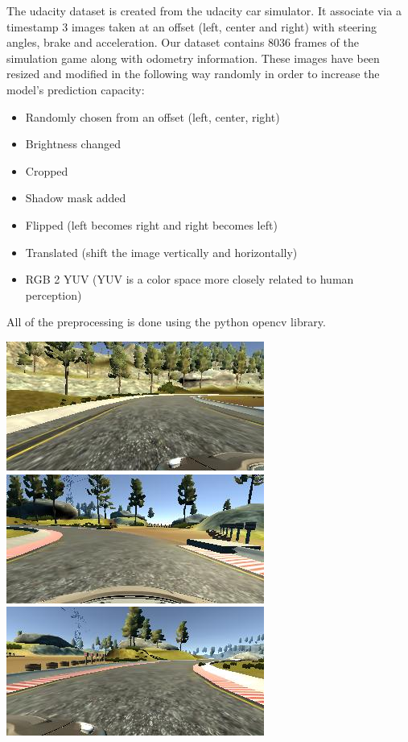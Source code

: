 \begin{multicols*}{2}
The udacity dataset is created from the udacity car simulator. It associate via a timestamp 3 images taken at an offset (left, center and right) with steering angles, brake and acceleration. Our dataset contains 8036 frames of the simulation game along with odometry information. These images have been resized and modified in the following way randomly in order to increase the model’s prediction capacity: 
\begin{itemize}	
	\item Randomly chosen from an offset (left, center, right)
	\item Brightness changed
	\item Cropped
	\item Shadow mask added
	\item Flipped (left becomes right and right becomes left)
	\item Translated (shift the image vertically and horizontally)
	\item RGB 2 YUV (YUV is a color space more closely related to human perception)
\end{itemize}
All of the preprocessing is done using the python opencv library.
\\
\begin{minipage}{.25\textwidth}
	\centering
	\includegraphics[width=0.2\linewidth]{images/left_image.png}
	\includegraphics[width=0.2\linewidth]{images/center_image.png}
	\includegraphics[width=0.2\linewidth]{images/right_image.png}
\end{minipage}
\end{multicols*}